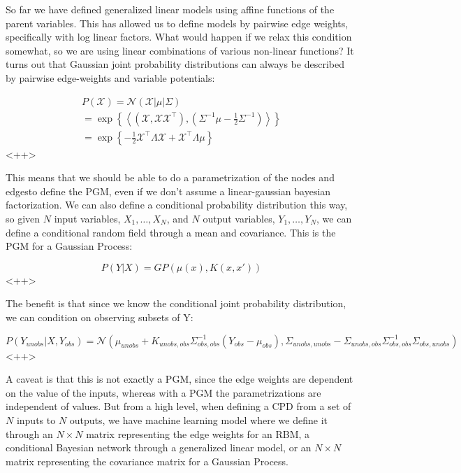 \documentclass[a4paper]{article}
\begin{document}
So far we have defined generalized linear models using affine functions of the parent variables. 
This has allowed us to define models by pairwise edge weights, specifically with log linear factors. 
What would happen if we relax this condition somewhat, so we are using linear combinations of various non-linear functions? 
It turns out that Gaussian joint probability distributions can always be described by pairwise edge-weights and variable potentials:

\begin{equation}
  \begin{split}
    P(\mathcal{X}) = \mathcal{N}\left( \mathcal{X} \vert \mu \vert \Sigma \right) \\
    = \exp\left\{ \left< \left( \mathcal{X}, \mathcal{X} \mathcal{X}^{\intercal} \right), \left( \Sigma^{-1} \mu -\frac{1}{2} \Sigma^{-1} \right) \right> \right\}\\
    = \exp\left\{ - \frac{1}{2} \mathcal{X}^{\intercal} \Lambda \mathcal{X} + \mathcal{X}^{\intercal} \Lambda \mu \right\} 
  \end{split}
  \label{<++>}
\end{equation}<++>

This means that we should be able to do a parametrization of the nodes and edgesto define the PGM, even if we don't assume a linear-gaussian bayesian factorization. 
We can also define a conditional probability distribution this way, so given $N$ input variables, $X_1,\ldots,X_N$, and $N$ output variables, $Y_1,\ldots,Y_N$, we can define a conditional random field through a mean and covariance. 
This is the PGM for a Gaussian Process:

\begin{equation}
  P(Y \vert X) = GP\left( \mu(x), K(x,x') \right)
  \label{<++>}
\end{equation}<++>

The benefit is that since we know the conditional joint probability distribution, we can condition on observing subsets of Y:

\begin{equation}
  P(Y_{unobs} \vert X, Y_{obs}) = \mathcal{N} \left( \mu_{unobs} + K_{unobs,obs} \Sigma_{obs,obs}^{-1} \left( Y_{obs} - \mu_{obs} \right), \Sigma_{unobs,unobs} - \Sigma_{unobs,obs} \Sigma_{obs,obs}^{-1} \Sigma_{obs,unobs} \right)
  \label{<++>}
\end{equation}<++>

A caveat is that this is not exactly a PGM, since the edge weights are dependent on the value of the inputs, whereas with a PGM the parametrizations are independent of values. 
But from a high level, when defining a CPD from a set of $N$ inputs to $N$ outputs, we have machine learning model where we define it through an $N \times N$ matrix representing the edge weights for an RBM, a conditional Bayesian network through a generalized linear model,  or an $N \times N$ matrix representing the covariance matrix for a Gaussian Process.
\end{document}
